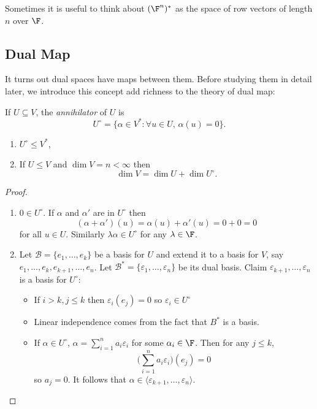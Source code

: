 \documentclass[a4paper]{article}
\newcommand*{\ann}{\circ}
\newcommand*{\basis}{\mathcal}
\theoremstyle{definition}
\begin{document}
\begin{remark}
  Sometimes it is useful to think about \((\F^n)^*\) as the space of row vectors of length \(n\) over \(\F\).
\end{remark}

\subsection{Dual Map}

It turns out dual spaces have maps between them. Before studying them in detail later, we introduce this concept add richness to the theory of dual map:

\begin{definition}[Annihilator]
  If \(U \subseteq V\), the \emph{annihilator} of \(U\) is
  \[
    U^\ann = \{\alpha\in V^*: \forall u \in U,\,\alpha(u) = 0 \}.
  \]
\end{definition}

\begin{lemma}\leavevmode
  \begin{enumerate}
  \item \(U^\ann \leq V^*\),
  \item If \(U \leq V\) and \(\dim V = n < \infty\) then
    \[
      \dim V = \dim U + \dim U^\ann.
    \]
  \end{enumerate}
\end{lemma}

\begin{proof}\leavevmode
  \begin{enumerate}
  \item \(0 \in U^\ann\). If \(\alpha\) and \(\alpha'\) are in \(U^\ann\) then
    \[
      (\alpha+ \alpha')(u) = \alpha(u) + \alpha'(u) = 0+0 = 0
    \]
    for all \(u\in U\). Similarly \(\lambda\alpha\in U^\ann\) for any \(\lambda \in \F\).
  \item Let \(\basis B = \{e_1,\dots, e_k\}\) be a basis for \(U\) and extend it to a basis for \(V\), say \(e_1,\dots,e_k,e_{k+1},\dots,e_n\). Let \(\basis B^*=\{\varepsilon_1,\dots,\varepsilon_n\}\) be its dual basis. Claim \(\varepsilon_{k+1},\dots,\varepsilon_n \) is a basis for \(U^\ann\):
    \begin{itemize}
    \item If \(i>k,j\leq k\) then \(\varepsilon_i(e_j) = 0 \) so \(\varepsilon_i\in U^\ann\)
    \item Linear independence comes from the fact that \(B^*\) is a basis.
    \item If \(\alpha\in U^\ann\), \(\alpha = \sum_{i=1}^na_i\varepsilon_i\) for some \(\alpha_i\in \F\). Then for any \(j\leq k\),
      \[
        \Big( \sum_{i=1}^{n}a_i\varepsilon_i \Big) (e_j) = 0
      \]
      so \(a_j=0\). It follows that \(\alpha \in \langle \varepsilon_{k+1},\dots,\varepsilon_n \rangle\).
    \end{itemize}
  \end{enumerate}
\end{proof}
\end{document}
